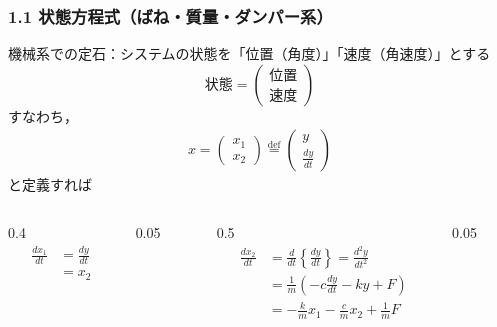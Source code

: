 \documentclass[10pt]{beamer}
\begin{document}
\begin{frame}[t]
\frametitle{1.1 状態方程式（ばね・質量・ダンパー系）}
機械系での定石：システムの状態を「位置（角度）」「速度（角速度）」とする
\[
 \mbox{状態} =
 \left(\begin{array}{c}
         \mbox{位置}\\
   \mbox{速度}
       \end{array}\right)
\]
すなわち，
\begin{gather}
 x = \left(\begin{array}{c}
            x_1 \\
      x_2
     \end{array}\right)
 \stackrel{\text{def}}{=}
 \left(\begin{array}{c}
         y \\
  \frac{dy}{dt}
       \end{array}\right)
\end{gather}
と定義すれば
\begin{columns}[t]
\begin{column}{0.4\textwidth}
\begin{align}
  \frac{dx_1}{dt} &= \frac{dy}{dt} \nonumber \\
                  &= x_2
\end{align}
\end{column}
\begin{column}{0.05\textwidth}

\end{column}
\begin{column}{0.5\textwidth}
\begin{align}
  \frac{dx_2}{dt} &= \frac{d}{dt} \left\{\frac{dy}{dt} \right\}
       = \frac{d^2 y}{dt^2} \nonumber \\
      &= \frac{1}{m} (-c \frac{dy}{dt} -k y + F) \nonumber \\
      &= -\frac{k}{m} x_1 - \frac{c}{m} x_2 + \frac{1}{m} F
\end{align}
\end{column}
\begin{column}{0.05\textwidth}

\end{column}
\end{columns}

\end{frame}
\end{document}
